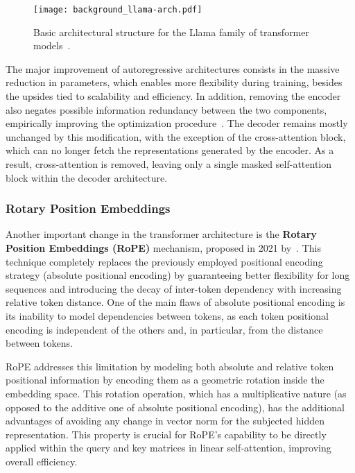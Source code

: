 \begin{figure}[t!]
    \centering
    \texttt{[image: background\_llama-arch.pdf]}
    \caption{Basic architectural structure for the Llama family of transformer models~\cite{touvron2023,dubey2024}.}
    \label{fig:background_llama-arch}
\end{figure}

The major improvement of autoregressive architectures consists in the massive reduction in parameters, which enables more flexibility during training, besides the upsides tied to scalability and efficiency.
In addition, removing the encoder also negates possible information redundancy between the two components, empirically improving the optimization procedure~\citet{liu2018}.
The decoder remains mostly unchanged by this modification, with the exception of the cross-attention block, which can no longer fetch the representations generated by the encoder.
As a result, cross-attention is removed, leaving only a single masked self-attention block within the decoder architecture.

\subsubsection*{Rotary Position Embeddings}

Another important change in the transformer architecture is the \textbf{Rotary Position Embeddings (RoPE)} mechanism, proposed in 2021 by~\citet{su2024}.
This technique completely replaces the previously employed positional encoding strategy (absolute positional encoding) by guaranteeing better flexibility for long sequences and introducing the decay of inter-token dependency with increasing relative token distance.
One of the main flaws of absolute positional encoding is its inability to model dependencies between tokens, as each token positional encoding is independent of the others and, in particular, from the distance between tokens.

RoPE addresses this limitation by modeling both absolute and relative token positional information by encoding them as a geometric rotation inside the embedding space.
This rotation operation, which has a multiplicative nature (as opposed to the additive one of absolute positional encoding), has the additional advantages of avoiding any change in vector norm for the subjected hidden representation.
This property is crucial for RoPE's capability to be directly applied within the query and key matrices in linear self-attention, improving overall efficiency.

